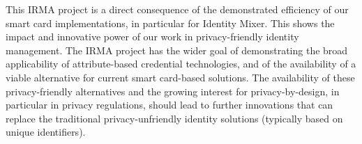 
This IRMA project is a direct consequence of the demonstrated efficiency of our
smart card implementations, in particular for Identity Mixer. This shows the
impact and innovative power of our work in privacy-friendly identity management.
The IRMA project has the wider goal of demonstrating the broad applicability of
attribute-based credential technologies, and of the availability of a viable
alternative for current smart card-based solutions.
The availability of these privacy-friendly alternatives and the growing interest
for privacy-by-design, in particular in privacy regulations, should lead to
further innovations that can replace the traditional privacy-unfriendly identity
solutions (typically based on unique identifiers).
